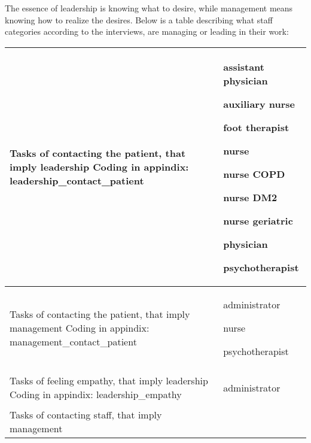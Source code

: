 \documentclass[12pt,a4paper,oneside]{article}
\begin{document}
The essence of leadership is knowing what to desire, while management means knowing how to realize the desires.
%
Below is a table describing what staff categories according to the interviews, are managing or leading in their work:
\nopagebreak
\begin{table}
\begin{tabularx}{\textwidth}{|X|X|}
\hline
Tasks of contacting the patient, that imply leadership
{\newline\tiny Coding in appindix: {leadership\_contact\_patient}}&{\begin{itemize}
\vspace{-1.5em}\setlength\itemsep{0em}
{ \item assistant physician}
{ \item auxiliary nurse}
{ \item foot therapist}
{ \item nurse}
{ \item nurse COPD}
{ \item nurse DM2}
{ \item nurse geriatric}
{ \item physician}
{ \item psychotherapist}\vspace{-.5em}\vspace{-.5em}\end{itemize}}\\
\hline
Tasks of contacting the patient, that imply management
{\newline\tiny Coding in appindix: {management\_contact\_patient}}&{\begin{itemize}
\vspace{-1.5em}\setlength\itemsep{0em}
{ \item administrator}
{ \item nurse}
{ \item psychotherapist}
\vspace{-.5em}\end{itemize}}\\
\hline
Tasks of feeling empathy, that imply leadership
{\newline\tiny Coding in appindix: {leadership\_empathy}}&{\begin{itemize}
\vspace{-1.5em}\setlength\itemsep{0em}
{ \item administrator}
\vspace{-.5em}\end{itemize}}\\
\hline
Tasks of contacting staff, that imply management

\end{tabularx}
\end{table}
\end{document}
